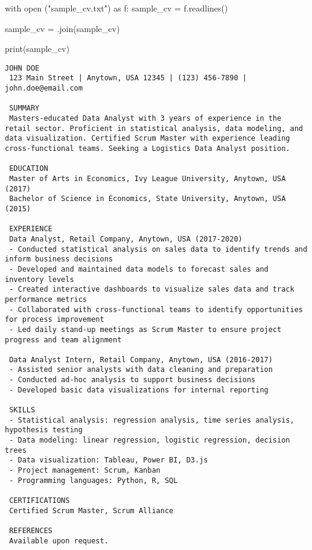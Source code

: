 \documentclass[
  letterpaper,
  DIV=11,
  numbers=noendperiod]{scrartcl}
\newenvironment{Shaded}{\begin{snugshade}}{\end{snugshade}}
\newcommand{\BuiltInTok}[1]{\textcolor[rgb]{0.00,0.23,0.31}{#1}}
\newcommand{\ControlFlowTok}[1]{\textcolor[rgb]{0.00,0.23,0.31}{#1}}
\newcommand{\ImportTok}[1]{\textcolor[rgb]{0.00,0.46,0.62}{#1}}
\newcommand{\NormalTok}[1]{\textcolor[rgb]{0.00,0.23,0.31}{#1}}
\newcommand{\OperatorTok}[1]{\textcolor[rgb]{0.37,0.37,0.37}{#1}}
\newcommand{\StringTok}[1]{\textcolor[rgb]{0.13,0.47,0.30}{#1}}
\begin{document}
\begin{Shaded}
\begin{Highlighting}[]
\ControlFlowTok{with} \BuiltInTok{open}\NormalTok{ (}\StringTok{"sample\_cv.txt"}\NormalTok{) }\ImportTok{as}\NormalTok{ f:}
\NormalTok{  sample\_cv }\OperatorTok{=}\NormalTok{ f.readlines()}

\NormalTok{sample\_cv }\OperatorTok{=}\StringTok{\textquotesingle{} \textquotesingle{}}\NormalTok{.join(sample\_cv)}

\BuiltInTok{print}\NormalTok{(sample\_cv)}
\end{Highlighting}
\end{Shaded}

\begin{verbatim}
JOHN DOE
 123 Main Street | Anytown, USA 12345 | (123) 456-7890 | john.doe@email.com
 
 SUMMARY
 Masters-educated Data Analyst with 3 years of experience in the retail sector. Proficient in statistical analysis, data modeling, and data visualization. Certified Scrum Master with experience leading cross-functional teams. Seeking a Logistics Data Analyst position.
 
 EDUCATION
 Master of Arts in Economics, Ivy League University, Anytown, USA (2017)
 Bachelor of Science in Economics, State University, Anytown, USA (2015)
 
 EXPERIENCE
 Data Analyst, Retail Company, Anytown, USA (2017-2020)
 - Conducted statistical analysis on sales data to identify trends and inform business decisions
 - Developed and maintained data models to forecast sales and inventory levels
 - Created interactive dashboards to visualize sales data and track performance metrics
 - Collaborated with cross-functional teams to identify opportunities for process improvement
 - Led daily stand-up meetings as Scrum Master to ensure project progress and team alignment
 
 Data Analyst Intern, Retail Company, Anytown, USA (2016-2017)
 - Assisted senior analysts with data cleaning and preparation
 - Conducted ad-hoc analysis to support business decisions
 - Developed basic data visualizations for internal reporting
 
 SKILLS
 - Statistical analysis: regression analysis, time series analysis, hypothesis testing
 - Data modeling: linear regression, logistic regression, decision trees
 - Data visualization: Tableau, Power BI, D3.js
 - Project management: Scrum, Kanban
 - Programming languages: Python, R, SQL
 
 CERTIFICATIONS
 Certified Scrum Master, Scrum Alliance
 
 REFERENCES
 Available upon request.
\end{verbatim}
\end{document}

